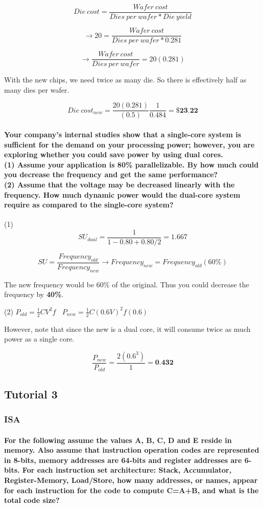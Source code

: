 \documentclass{article}
\begin{document}
$$Die\ cost = \dfrac{Wafer\ cost}{Dies\ per\ wafer * Die\ yield}$$

$$\rightarrow 20 = \frac{Wafer\ cost}{Dies\ per\ wafer * 0.281}$$

$$\rightarrow \frac{Wafer\ cost}{Dies\ per\ wafer} = 20(0.281)$$

With the new chips, we need twice as many die. So there is effectively half as many dies per wafer.

$$Die\ cost_{new} = \frac{20(0.281)}{(0.5)}\frac{1}{0.484} = \textbf{\$23.22}$$

\paragraph{Your company's internal studies show that a single-core system is sufficient for the
demand on your processing power; however, you are exploring whether you could save
power by using dual cores.
\\(1) Assume your application is 80\% parallelizable. By how much could you decrease the
frequency and get the same performance?
\\(2) Assume that the voltage may be decreased linearly with the frequency. How much dynamic
power would the dual-core system require as compared to the single-core system?}

(1) $$SU_{dual} = \dfrac{1}{1 - 0.80 + 0.80/2} = 1.667$$ 

$$SU = \frac{Frequency_{old}}{Frequency_{new}} \rightarrow Frequency_{new} = Frequency_{old}(60\%) $$

The new frequency would be 60\% of the original. Thus you could decrease the frequency by \textbf{40\%}.

\noindent (2) $P_{old} = \frac{1}{2}C V^2 f\ \ \ \ P_{new} = \frac{1}{2}C (0.6 V)^2 f(0.6)$

However, note that since the new is a dual core, it will consume twice as much power as a single core.

$$\frac{P_{new}}{P_{old}} = \frac{2(0.6^3)}{1} = \textbf{0.432} $$

\subsection{Tutorial 3}

\subsubsection{ISA}

\paragraph{For the following assume the values A, B, C, D and E reside in memory. Also assume
that instruction operation codes are represented in 8-bits, memory addresses are 64-bits and
register addresses are 6-bits. For each instruction set architecture: Stack, Accumulator, Register-Memory, Load/Store, how many addresses, or names,
appear for each instruction for the code to compute C=A+B, and what is the total code size?}
\end{document}
